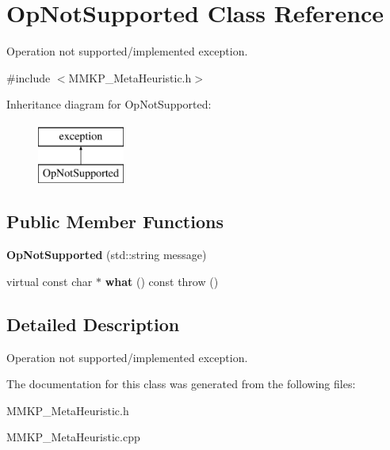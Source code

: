 \hypertarget{class_op_not_supported}{\section{Op\+Not\+Supported Class Reference}
\label{class_op_not_supported}
}


Operation not supported/implemented exception.  




{\ttfamily \#include $<$M\+M\+K\+P\+\_\+\+Meta\+Heuristic.\+h$>$}

Inheritance diagram for Op\+Not\+Supported\+:\begin{figure}[H]
\begin{center}
\leavevmode
\includegraphics[height=2.000000cm]{class_op_not_supported}
\end{center}
\end{figure}
\subsection*{Public Member Functions}
\begin{DoxyCompactItemize}
\item 
\hypertarget{class_op_not_supported_ae538c9ab4dfbb4f82db960de61cb7458}{{\bfseries Op\+Not\+Supported} (std\+::string message)}\label{class_op_not_supported_ae538c9ab4dfbb4f82db960de61cb7458}

\item 
\hypertarget{class_op_not_supported_a2fea1b12d8fee8e97ee2c428cd62d7e0}{virtual const char $\ast$ {\bfseries what} () const   throw ()}\label{class_op_not_supported_a2fea1b12d8fee8e97ee2c428cd62d7e0}

\end{DoxyCompactItemize}


\subsection{Detailed Description}
Operation not supported/implemented exception. 

The documentation for this class was generated from the following files\+:\begin{DoxyCompactItemize}
\item 
M\+M\+K\+P\+\_\+\+Meta\+Heuristic.\+h\item 
M\+M\+K\+P\+\_\+\+Meta\+Heuristic.\+cpp\end{DoxyCompactItemize}
